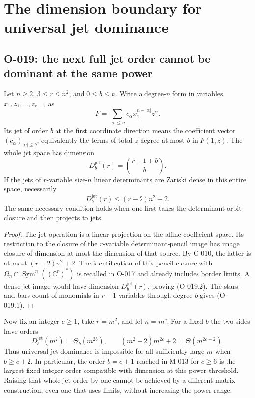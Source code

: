 \section{The dimension boundary for universal jet dominance}

\subsection{O-019: the next full jet order cannot be dominant at the same power}
Let $n\geq2$, $3\leq r\leq n^2$, and $0\leq b\leq n$.
Write a degree-$n$ form in variables $x_1,z_1,\ldots,z_{r-1}$
as
\[
 F=\sum_{|\alpha|\leq n}
                  c_\alpha x_1^{n-|\alpha|}z^\alpha.
\]
Its jet of order $b$ at the first coordinate direction means
the coefficient vector $(c_\alpha)_{|\alpha|\leq b}$,
equivalently the terms of total $z$-degree at most $b$ in
$F(1,z)$. The whole jet space has dimension
\[
                    D_b^{\mathrm{jet}}(r)=\binom{r-1+b}{b}.    \tag{O-019.1}
\]
If the jets of $r$-variable size-$n$ linear determinants
are Zariski dense in this entire space, necessarily
\[
                   D_b^{\mathrm{jet}}(r)\leq(r-2)n^2+2.       \tag{O-019.2}
\]
The same necessary condition holds when one first takes
the determinant orbit closure and then projects to jets.

\begin{proof}
The jet operation is a linear projection on the affine
coefficient space. Its restriction to the closure of the
$r$-variable determinant-pencil image has image closure of
dimension at most the dimension of that source. By O-010,
the latter is at most $(r-2)n^2+2$.
The identification of this pencil closure with
$\Omega_n\cap\operatorname{Sym}^n((\mathbb C^r)^*)$
is recalled in O-017 and already includes border limits.
A dense jet image would have dimension $D_b^{\mathrm{jet}}(r)$, proving
(O-019.2). The stars-and-bars count of monomials in $r-1$
variables through degree $b$ gives (O-019.1).
\end{proof}

Now fix an integer $c\geq1$, take $r=m^2$, and let
$n=m^c$. For a fixed $b$ the two sides have orders
\[
                   D_b^{\mathrm{jet}}(m^2)=\Theta_b(m^{2b}),
                \qquad (m^2-2)m^{2c}+2=\Theta(m^{2c+2}).
\]
Thus universal jet dominance is impossible for all sufficiently
large $m$ when $b\geq c+2$. In particular, the order
$b=c+1$ reached in M-013 for $c\geq6$ is the largest
fixed integer order compatible with dimension at this power
threshold. Raising that whole jet order by one cannot be
achieved by a different matrix construction, even one that
uses limits, without increasing the power range.

